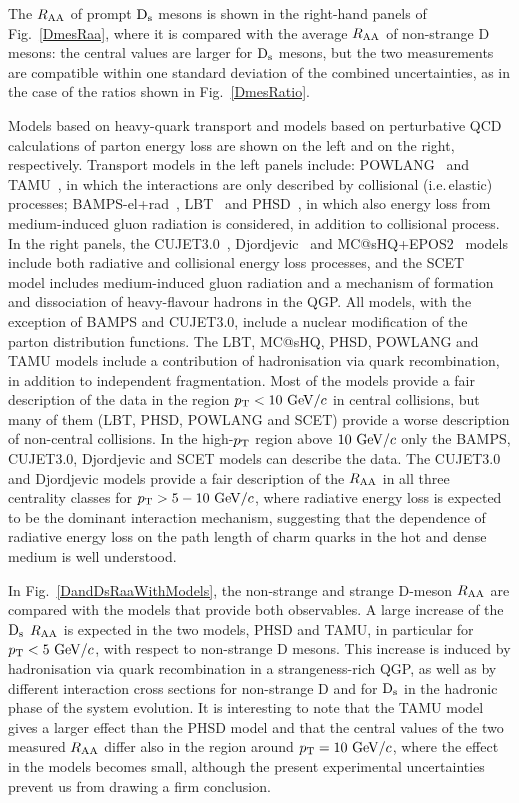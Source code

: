 The $R_{\rm AA}$ of prompt ${\rm D_s}$ mesons is shown in the 
right-hand panels of Fig.~\ref{DmesRaa},
where it is compared with the average $R_{\rm AA}$ of non-strange 
D mesons: the central values are
larger for ${\rm D_s}$ mesons, but the two measurements are 
compatible within one standard deviation of the combined 
uncertainties, as in the case of the ratios shown in Fig.~\ref{DmesRatio}.



Models based on heavy-quark transport and models based
 on perturbative QCD calculations of parton energy loss 
 are shown on the left and on the right, respectively.
Transport models in the left panels include: 
POWLANG~\cite{Beraudo:2014boa} and TAMU~\cite{He:2014cla}, 
in which the interactions are only described by collisional (i.e.\,elastic) processes; 
BAMPS-el+rad~\cite{Uphoff:2014hza}, LBT~\cite{Cao:2017hhk} 
and PHSD~\cite{Song:2015ykw}, in which also energy loss 
from medium-induced gluon radiation
is considered, in addition to collisional process.
In the right panels, the CUJET3.0~\cite{Xu:2015bbz}, 
Djordjevic~\cite{Djordjevic:2015hra} and MC@sHQ+EPOS2~\cite{Nahrgang:2013xaa}
 models include both radiative and collisional energy loss processes, and
the SCET~\cite{Kang:2016ofv} model includes 
medium-induced gluon radiation and a mechanism of formation
 and dissociation of heavy-flavour hadrons in the QGP.
All models, with the exception of BAMPS and CUJET3.0, include 
a nuclear modification of the parton distribution functions.
The LBT, MC@sHQ, PHSD, POWLANG and TAMU
models include a contribution of hadronisation via quark 
recombination, in addition to independent fragmentation. 
Most of the models provide a fair description of the data in the
 region $p_{\rm T}<10~\mathrm{GeV}/c$ in central collisions, 
but many of them (LBT, PHSD, POWLANG and SCET) provide 
a worse description of non-central collisions.
In the high-$p_{\rm T}$ region above $10~\mathrm{GeV}/c$ only the BAMPS, 
CUJET3.0, Djordjevic and SCET models can describe the data. 
The CUJET3.0 and Djordjevic models provide a 
fair description of the $R_{\rm AA}$ in all three centrality classes for 
$p_{\rm T} > 5-10~\mathrm{GeV}/c$, where radiative energy loss is expected to 
be the dominant interaction mechanism, suggesting that the 
dependence of radiative energy loss on the path length of 
charm quarks in the hot and dense medium is well understood. 

In Fig.~\ref{DandDsRaaWithModels},  the non-strange and 
strange D-meson $R_{\rm AA}$ are compared with  
the models that provide both observables. A large increase of
 the ${\rm D_s}$ $R_{\rm AA}$ is expected in the two models, PHSD and 
 TAMU, in particular for $p_{\rm T}<5~\mathrm{GeV}/c$, with respect to 
 non-strange D mesons. This increase is induced by hadronisation 
 via quark recombination in a strangeness-rich QGP, as well as by different 
interaction cross sections for non-strange D and for ${\rm D_s}$ in 
the hadronic phase of the system evolution. It is interesting
 to note that the TAMU model gives a larger effect than the 
 PHSD model and that the central values of the two measured $R_{\rm AA}$ differ also 
in the region around $p_{\rm T}=10~\mathrm{GeV}/c$, where the effect in the 
models becomes small, although the present experimental 
uncertainties prevent us from drawing a firm conclusion. 


